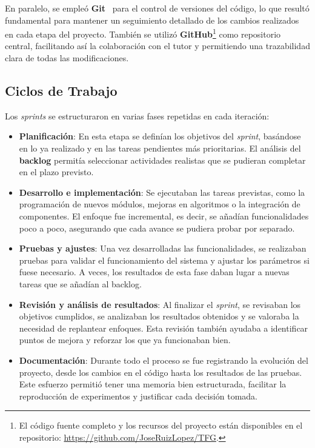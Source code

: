 En paralelo, se empleó \textbf{Git}~\cite{chaconProGit2014} para el control de versiones del código, lo que resultó
fundamental para mantener un seguimiento detallado de los cambios realizados en cada etapa del proyecto.
También se utilizó \textbf{GitHub}\footnote{El código fuente completo y los recursos del proyecto están disponibles en el repositorio: \url{https://github.com/JoseRuizLopez/TFG}.}
como repositorio central, facilitando así la colaboración con el tutor y permitiendo una trazabilidad clara de todas las modificaciones.


\subsection{Ciclos de Trabajo}\label{subsec:ciclos-de-trabajo}
Los \textit{sprints} se estructuraron en varias fases repetidas en cada iteración:

\begin{itemize}
    \item \textbf{Planificación}: En esta etapa se definían los objetivos del \textit{sprint}, basándose en lo ya realizado y en
          las tareas pendientes más prioritarias.
          El análisis del \textbf{backlog} permitía seleccionar actividades realistas que se pudieran completar en el plazo
          previsto.

    \item \textbf{Desarrollo e implementación}: Se ejecutaban las tareas previstas, como la programación de nuevos
          módulos, mejoras en algoritmos o la integración de componentes.
          El enfoque fue incremental, es decir, se añadían funcionalidades poco a poco, asegurando que cada avance se pudiera
          probar por separado.

    \item \textbf{Pruebas y ajustes}: Una vez desarrolladas las funcionalidades,
          se realizaban pruebas para validar el funcionamiento del sistema y ajustar los parámetros si fuese necesario.
          A veces, los resultados de esta fase daban lugar a nuevas tareas que se añadían al backlog.

    \item \textbf{Revisión y análisis de resultados}: Al finalizar el \textit{sprint}, se revisaban los objetivos cumplidos, se
          analizaban los resultados obtenidos y se valoraba la necesidad de replantear enfoques.
          Esta revisión también ayudaba a identificar puntos de mejora y reforzar los que ya funcionaban bien.

    \item \textbf{Documentación}: Durante todo el proceso se fue registrando la evolución del proyecto, desde los
          cambios en el código hasta los resultados de las pruebas.
          Este esfuerzo permitió tener una memoria bien estructurada, facilitar la reproducción de experimentos y justificar cada
          decisión tomada.
\end{itemize}


